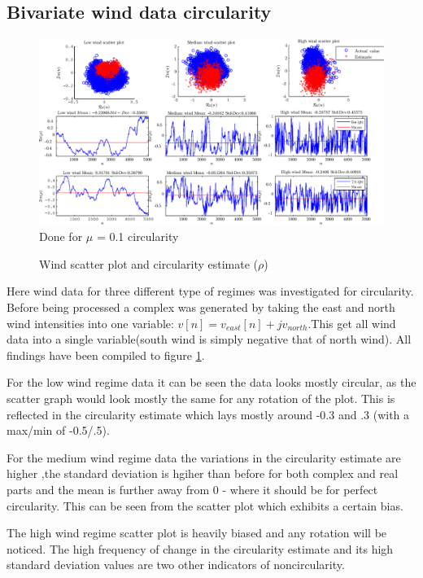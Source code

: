 \documentclass[10pt,twoside,a4paper]{report}
\begin{document}
\subsection{Bivariate wind data circularity}

\begin{figure}[h]
\centering
\includegraphics[width=1.0\textwidth]{cw4im/2e.eps}
Done for $\mu$ = 0.1 circularity
\caption{Wind scatter plot and circularity estimate ($\rho$)}
\label{fig:4_2e}
\end{figure}

Here wind data for three different type of regimes was investigated for circularity. Before being processed a complex was generated by taking the east and north wind intensities into one variable: $v[n] = v_{east}[n]+jv_{north}$.This get all wind data into a single variable(south wind is simply negative that of north wind). All findings have been compiled to figure \ref{fig:4_2e}.

For the low wind regime data it can be seen the data looks mostly circular, as the scatter graph would look mostly the same for any rotation of the plot. This is reflected in the circularity estimate which lays mostly around -0.3 and .3 (with a max/min of -0.5/.5). 

For the medium wind regime data the variations in the circularity estimate are higher ,the standard deviation is hgiher than before for both complex and real parts and the mean is further away from 0 - where it should be for perfect circularity. This can be seen from the scatter plot which exhibits a certain bias.

The high wind regime scatter plot is heavily biased and any rotation will be noticed. The high frequency of change in the circularity estimate and its high standard deviation values are two other indicators of noncircularity.
\end{document}
